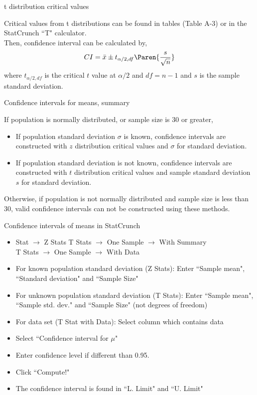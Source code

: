 \documentclass[xcolor=table, handout]{beamer}
\begin{document}
\begin{frame}{t distribution critical values}
\begin{block}{}
\large
Critical values from t distributions can be found in tables (Table A-3) or in the StatCrunch ``T" calculator.\\
\pause\medskip
Then, confidence interval can be calculated by,
\[CI = \bar x \pm t_{\alpha/2, df} \Paren{\frac s {\sqrt n}}\]
where $t_{\alpha/2, df}$ is the critical $t$ value at $\alpha/2$ and $df=n-1$ and $s$ is the sample standard deviation.
\end{block}
\end{frame}

\begin{frame}{Confidence intervals for means, summary}
\begin{block}{}
\large
If population is normally distributed, or sample size is 30 or greater,
\begin{itemize}
\pause\item If population standard deviation $\sigma$ is known, confidence intervals are constructed with $z$ distribution critical values and $\sigma$ for standard deviation.
\pause\item If population standard deviation is not known, confidence intervals are constructed with $t$ distribution critical values and sample standard deviation $s$ for standard deviation.
\end{itemize}
\pause Otherwise, if population is not normally distributed and sample size is less than 30, valid confidence intervals can not be constructed using these methods.
\end{block}
\end{frame}

\begin{frame}{Confidence intervals of means in StatCrunch}
\begin{block}{}
\begin{itemize}
\item Stat $\to$ Z Stats  T Stats $\to$ One Sample $\to$ With Summary \\T Stats $\to$ One Sample $\to$ With Data
\item For known population standard deviation (Z Stats): Enter ``Sample mean", ``Standard deviation" and ``Sample Size" 
\item For unknown population standard deviation (T Stats): Enter ``Sample mean", ``Sample std. dev." and ``Sample Size" (not degrees of freedom)
\item For data set (T Stat with Data): Select column which contains data
\item Select ``Confidence interval for $\mu$"
\item Enter confidence level if different than 0.95.
\item Click ``Compute!"
\item The confidence interval is found in ``L. Limit" and ``U. Limit"
\end{itemize}
\end{block}
\end{frame}
\end{document}
